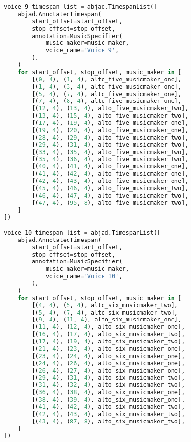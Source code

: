 \begin{lstlisting}[language=Python, caption=Invocation Source Code]
voice_9_timespan_list = abjad.TimespanList([
    abjad.AnnotatedTimespan(
        start_offset=start_offset,
        stop_offset=stop_offset,
        annotation=MusicSpecifier(
            music_maker=music_maker,
            voice_name='Voice 9',
        ),
    )
    for start_offset, stop_offset, music_maker in [
        [(0, 4), (1, 4), alto_five_musicmaker_one],
        [(1, 4), (3, 4), alto_five_musicmaker_one],
        [(5, 4), (7, 4), alto_five_musicmaker_one],
        [(7, 4), (8, 4), alto_five_musicmaker_one],
        [(12, 4), (13, 4), alto_five_musicmaker_two],
        [(13, 4), (15, 4), alto_five_musicmaker_two],
        [(17, 4), (19, 4), alto_five_musicmaker_one],
        [(19, 4), (20, 4), alto_five_musicmaker_one],
        [(28, 4), (29, 4), alto_five_musicmaker_two],
        [(29, 4), (31, 4), alto_five_musicmaker_two],
        [(33, 4), (35, 4), alto_five_musicmaker_two],
        [(35, 4), (36, 4), alto_five_musicmaker_two],
        [(40, 4), (41, 4), alto_five_musicmaker_one],
        [(41, 4), (42, 4), alto_five_musicmaker_one],
        [(42, 4), (43, 4), alto_five_musicmaker_one],
        [(45, 4), (46, 4), alto_five_musicmaker_two],
        [(46, 4), (47, 4), alto_five_musicmaker_two],
        [(47, 4), (95, 8), alto_five_musicmaker_two],
    ]
])

voice_10_timespan_list = abjad.TimespanList([
    abjad.AnnotatedTimespan(
        start_offset=start_offset,
        stop_offset=stop_offset,
        annotation=MusicSpecifier(
            music_maker=music_maker,
            voice_name='Voice 10',
        ),
    )
    for start_offset, stop_offset, music_maker in [
        [(4, 4), (5, 4), alto_six_musicmaker_two],
        [(5, 4), (7, 4), alto_six_musicmaker_two],
        [(9, 4), (11, 4), alto_six_musicmaker_one],
        [(11, 4), (12, 4), alto_six_musicmaker_one],
        [(16, 4), (17, 4), alto_six_musicmaker_two],
        [(17, 4), (19, 4), alto_six_musicmaker_two],
        [(21, 4), (23, 4), alto_six_musicmaker_one],
        [(23, 4), (24, 4), alto_six_musicmaker_one],
        [(24, 4), (26, 4), alto_six_musicmaker_one],
        [(26, 4), (27, 4), alto_six_musicmaker_one],
        [(29, 4), (31, 4), alto_six_musicmaker_two],
        [(31, 4), (32, 4), alto_six_musicmaker_two],
        [(36, 4), (38, 4), alto_six_musicmaker_one],
        [(38, 4), (39, 4), alto_six_musicmaker_one],
        [(41, 4), (42, 4), alto_six_musicmaker_two],
        [(42, 4), (43, 4), alto_six_musicmaker_two],
        [(43, 4), (87, 8), alto_six_musicmaker_two],
    ]
])


\end{lstlisting}
